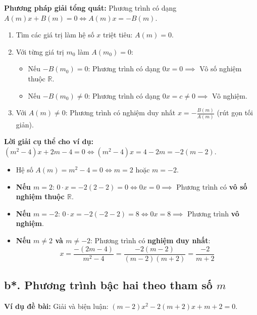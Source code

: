 \documentclass[12pt,a4paper]{article}
\begin{document}
\textbf{Phương pháp giải tổng quát:}
Phương trình có dạng $A(m)x + B(m) = 0 \iff A(m)x = -B(m)$.
\begin{enumerate}
    \item Tìm các giá trị làm hệ số $x$ triệt tiêu: $A(m) = 0$.
    \item Với từng giá trị $m_0$ làm $A(m_0) = 0$:
    \begin{itemize}
        \item Nếu $-B(m_0) = 0$: Phương trình có dạng $0x = 0 \implies$ Vô số nghiệm thuộc $\mathbb{R}$.
        \item Nếu $-B(m_0) \ne 0$: Phương trình có dạng $0x = c \ne 0 \implies$ Vô nghiệm.
    \end{itemize}
    \item Với $A(m) \ne 0$: Phương trình có nghiệm duy nhất $x = -\frac{B(m)}{A(m)}$ (rút gọn tối giản).
\end{enumerate}

\textbf{Lời giải cụ thể cho ví dụ:}
$(m^2 - 4)x + 2m - 4 = 0 \iff (m^2 - 4)x = 4 - 2m = -2(m - 2)$.
\begin{itemize}
    \item Hệ số $A(m) = m^2 - 4 = 0 \iff m = 2$ hoặc $m = -2$.
    \item \textbf{Nếu $m = 2$}: $0 \cdot x = -2(2 - 2) = 0 \iff 0x = 0 \implies$ Phương trình có \textbf{vô số nghiệm thuộc $\mathbb{R}$}.
    \item \textbf{Nếu $m = -2$}: $0 \cdot x = -2(-2 - 2) = 8 \iff 0x = 8 \implies$ Phương trình \textbf{vô nghiệm}.
    \item \textbf{Nếu $m \ne 2$ và $m \ne -2$}: Phương trình có \textbf{nghiệm duy nhất}:
    \begin{equation}
        x = \frac{-(2m - 4)}{m^2 - 4} = \frac{-2(m - 2)}{(m - 2)(m + 2)} = \frac{-2}{m + 2}
    \end{equation}
\end{itemize}

\subsection{b*. Phương trình bậc hai theo tham số $m$}
\textbf{Ví dụ đề bài:} Giải và biện luận: $(m - 2)x^2 - 2(m + 2)x + m + 2 = 0$.
\end{document}
